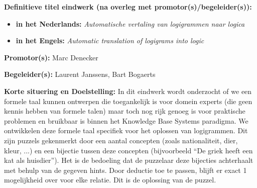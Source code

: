 \documentclass[12pt]{report}
\begin{document}
\pagestyle{myheadings}
\vspace{0.5cm}
{\bf Definitieve titel eindwerk (na overleg met promotor(s)/begeleider(s)):}
\begin{itemize}
\item {\bf in het Nederlands:} {\em Automatische vertaling van logigrammen naar logica}
\item {\bf in het Engels:} {\em Automatic translation of logigrams into logic}
\end{itemize}

\vspace{0.5cm}
{\bf Promotor(s):} Marc Denecker


\vspace{0.5cm}
{\bf Begeleider(s):} Laurent Janssens, Bart Bogaerts

\vspace{1cm}
{\bf Korte situering en Doelstelling: } In dit eindwerk wordt onderzocht of we een formele taal kunnen ontwerpen die toegankelijk is voor domein experts (die geen kennis hebben van formele talen) maar toch nog rijk genoeg is voor praktische problemen en bruikbaar is binnen het Knowledge Base Systems paradigma. We ontwikkelen deze formele taal specifiek voor het oplossen van logigrammen. Dit zijn puzzels gekenmerkt door een aantal concepten (zoals nationaliteit, dier, kleur, ...) en een bijectie tussen deze concepten (bijvoorbeeld ``De griek heeft een kat als huisdier''). Het is de bedoeling dat de puzzelaar deze bijecties achterhaalt met behulp van de gegeven hints. Door deductie toe te passen, blijft er exact 1 mogelijkheid over voor elke relatie. Dit is de oplossing van de puzzel.
\end{document}
